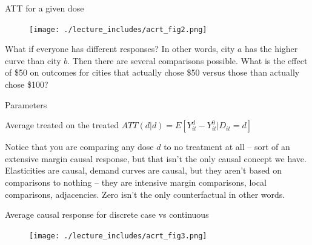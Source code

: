 \documentclass{beamer}
\begin{document}
\begin{frame}{ATT for a given dose}

\begin{figure}
\begin{center}
             \texttt{[image: ./lecture\_includes/acrt\_fig2.png]}
\end{center}
\end{figure}

What if everyone has different responses?  In other words, city $a$ has the higher curve than city $b$.  Then there are several comparisons possible.  What is the effect of \$50 on outcomes for cities that actually chose \$50 versus those than actually chose \$100?  

\end{frame}



\begin{frame}{Parameters}

\begin{block}{Average treated on the treated}
$ATT(d|d) = E[Y^d_{it} - Y^0_{it} | D_{it}=d]$
\end{block}

\bigskip

Notice that you are comparing any dose $d$ to no treatment at all -- sort of an extensive margin causal response, but that isn't the only causal concept we have.  Elasticities are causal, demand curves are causal, but they aren't based on comparisons to nothing -- they are intensive margin comparisons, local comparisons, adjacencies. Zero isn't the only counterfactual in other words.

\end{frame}

\begin{frame}{Average causal response for discrete case vs continuous}

\begin{figure}
\begin{center}
             \texttt{[image: ./lecture\_includes/acrt\_fig3.png]}
\end{center}
\end{figure}

\end{frame}
\end{document}

